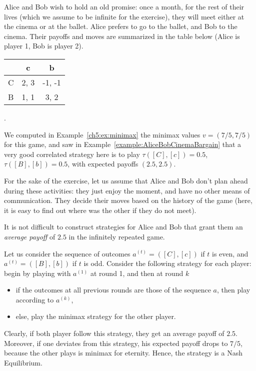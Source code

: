 \begin{example}
Alice and Bob wish to hold an old promise: once a month, for the rest of
their lives (which we assume to be infinite for the exercise), they will
meet either at the cinema or at the ballet.
Alice prefers to go to the ballet, and Bob to the cinema.
Their payoffs and moves are summarized in the table below (Alice is player
1, Bob is player 2).

\begin{center}
    \begin{tabular}{c | c  c}
          & c & b \\
        \hline
        C & 2, 3 & -1, -1 \\
        B & 1, 1 & 3, 2
    \end{tabular}.
\end{center}
We computed in Example~\ref{ch5:ex:minimax} the minimax values
$v = (7/5, 7/5)$ for this game, and saw in
Example~\ref{example:AliceBobCinemaBargain} that a very good correlated
strategy here is to play $\tau([C],[c]) = 0.5$, $\tau([B],[b]) = 0.5$,
with expected payoffs $(2.5,2.5)$.

For the sake of the exercise, let us assume that Alice and Bob don't plan
ahead during these activities: they just enjoy the moment, and have no
other means of communication.
They decide their moves based on the history of the game (here, it is easy
to find out where was the other if they do not meet).

It is not difficult to construct strategies for Alice and Bob that grant
them an \emph{average payoff} of $2.5$ in the infinitely repeated game.

Let us consider the sequence of outcomes $a^{(t)} = ([C],[c])$ if $t$ is
even, and $a^{(t)} = ([B],[b])$ if $t$ is odd.
Consider the following strategy for each player: begin by playing with
$a^{(1)}$ at round 1, and then at round $k$
\begin{itemize}
    \item if the outcomes at all previous rounds are those of the
    sequence $a$, then play according to $a^{(k)}$,
    \item else, play the minimax strategy for the other player.
\end{itemize}
Clearly, if both player follow this strategy, they get an average payoff
of $2.5$. Moreover, if one deviates from this strategy, his expected
payoff drops to $7/5$, because the other plays is minimax for eternity.
Hence, the strategy is a Nash Equilibrium.
\end{example}




